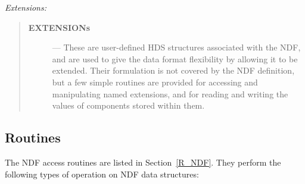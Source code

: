 {\large \em Extensions:}

\begin{quote}
\begin{description}

\item[{\bf EXTENSIONs}] --- These are user-defined HDS structures associated
with the NDF, and are used to give the data format flexibility by allowing it
to be extended.
Their formulation is not covered by the NDF definition, but a few simple
routines are provided for accessing and manipulating named extensions, and
for reading and writing the values of components stored within them.

\end{description}
\end{quote}

\subsection{Routines}

The NDF access routines are listed in Section~\ref{R_NDF}.
They perform the following types of operation on NDF data structures:

